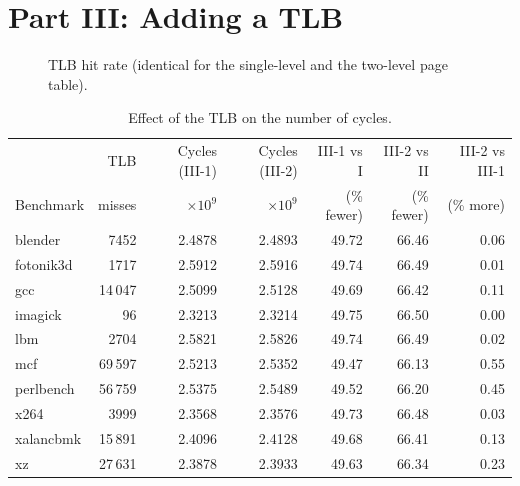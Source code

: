 \documentclass[11pt,a4paper]{article}
\begin{document}
\section{Part III: Adding a TLB}

\begin{figure}[H]
\centering
{}
\caption{TLB hit rate (identical for the single-level and the two-level page table).}
\label{fig:tlb}
\end{figure}

\begin{table}[H]
\centering\small
\begin{tabular}{@{}lrrrrrr@{}}
\toprule
& TLB & Cycles (III-1) & Cycles (III-2) & III-1 vs I & III-2 vs II & III-2 vs III-1 \\
Benchmark & misses & $\times10^{9}$ & $\times10^{9}$ & (\% fewer) & (\% fewer) & (\% more) \\
\midrule
blender   &  7452 & 2.4878 & 2.4893 & 49.72 & 66.46 & 0.06 \\
fotonik3d &  1717 & 2.5912 & 2.5916 & 49.74 & 66.49 & 0.01 \\
gcc       & 14\,047 & 2.5099 & 2.5128 & 49.69 & 66.42 & 0.11 \\
imagick   &    96 & 2.3213 & 2.3214 & 49.75 & 66.50 & 0.00 \\
lbm       &  2704 & 2.5821 & 2.5826 & 49.74 & 66.49 & 0.02 \\
mcf       & 69\,597 & 2.5213 & 2.5352 & 49.47 & 66.13 & 0.55 \\
perlbench & 56\,759 & 2.5375 & 2.5489 & 49.52 & 66.20 & 0.45 \\
x264      &  3999 & 2.3568 & 2.3576 & 49.73 & 66.48 & 0.03 \\
xalancbmk & 15\,891 & 2.4096 & 2.4128 & 49.68 & 66.41 & 0.13 \\
xz        & 27\,631 & 2.3878 & 2.3933 & 49.63 & 66.34 & 0.23 \\
\bottomrule
\end{tabular}
\caption{Effect of the TLB on the number of cycles.}
\label{tab:p3}
\end{table}
\end{document}
